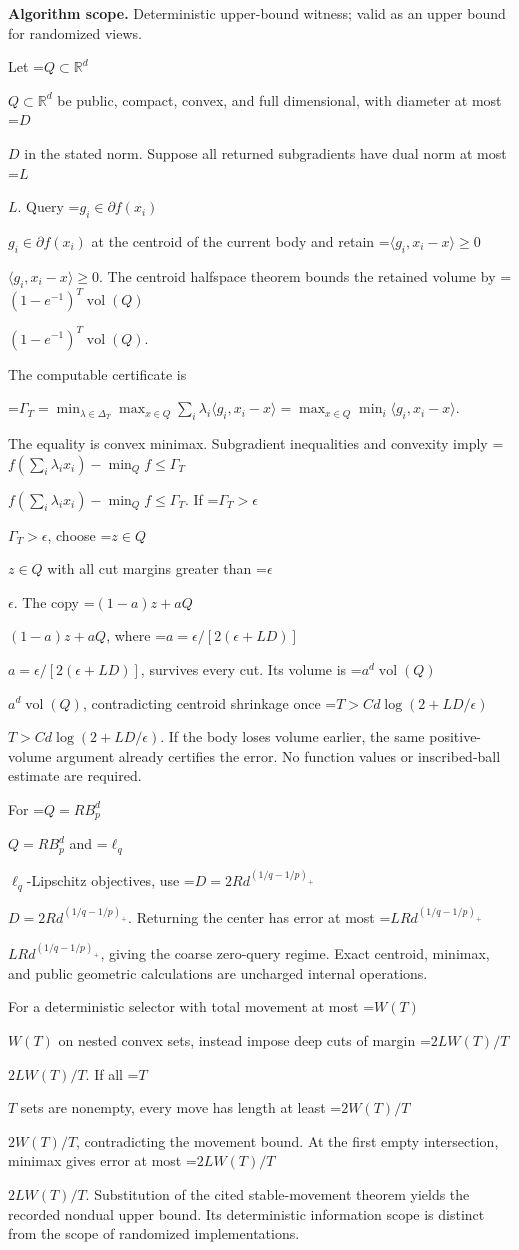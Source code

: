 \documentclass[10pt,a4paper]{article}
\newcommand{\AtlasMath}[1]{\par\begingroup\centering\setbox0=\hbox{$\displaystyle #1$}\ifdim\wd0>1.4\linewidth\typeout{ATLAS WIDE FORMULA: \the\wd0}\fi\ifdim\wd0>\linewidth\resizebox{\linewidth}{!}{\box0}\else\box0\fi\par\endgroup}
\newcommand{\AtlasInlineMath}[1]{\begingroup\setbox0=\hbox{$#1$}\ifdim\wd0>.4\linewidth\endgroup\AtlasMath{#1}\else\endgroup$#1$\fi}
\begin{document}
\textbf{Algorithm scope.} Deterministic upper-bound witness; valid as an upper bound for randomized views.

Let \AtlasInlineMath{Q\subset\mathbb R^d} be public, compact, convex, and full dimensional, with diameter at most \AtlasInlineMath{D} in the stated norm. Suppose all returned subgradients have dual norm at most \AtlasInlineMath{L}. Query \AtlasInlineMath{g_i\in\partial f(x_i)} at the centroid of the current body and retain \AtlasInlineMath{\langle g_i,x_i-x\rangle\ge0}. The centroid halfspace theorem bounds the retained volume by \AtlasInlineMath{(1-e^{-1})^T\operatorname{vol}(Q)}.

The computable certificate is

\AtlasMath{\Gamma_T=\min_{\lambda\in\Delta_T}\max_{x\in Q}\sum_i\lambda_i\langle g_i,x_i-x\rangle
=\max_{x\in Q}\min_i\langle g_i,x_i-x\rangle.}

The equality is convex minimax. Subgradient inequalities and convexity imply
\AtlasInlineMath{f(\sum_i\lambda_ix_i)-\min_Qf\le\Gamma_T}.
If \AtlasInlineMath{\Gamma_T>\epsilon}, choose \AtlasInlineMath{z\in Q} with all cut margins greater than \AtlasInlineMath{\epsilon}. The copy \AtlasInlineMath{(1-a)z+aQ}, where \AtlasInlineMath{a=\epsilon/[2(\epsilon+LD)]}, survives every cut. Its volume is \AtlasInlineMath{a^d\operatorname{vol}(Q)}, contradicting centroid shrinkage once \AtlasInlineMath{T>C d\log(2+LD/\epsilon)}. If the body loses volume earlier, the same positive-volume argument already certifies the error. No function values or inscribed-ball estimate are required.

For \AtlasInlineMath{Q=RB_p^d} and \AtlasInlineMath{\ell_q}-Lipschitz objectives, use \AtlasInlineMath{D=2Rd^{(1/q-1/p)_+}}. Returning the center has error at most \AtlasInlineMath{LRd^{(1/q-1/p)_+}}, giving the coarse zero-query regime. Exact centroid, minimax, and public geometric calculations are uncharged internal operations.

For a deterministic selector with total movement at most \AtlasInlineMath{W(T)} on nested convex sets, instead impose deep cuts of margin \AtlasInlineMath{2LW(T)/T}. If all \AtlasInlineMath{T} sets are nonempty, every move has length at least \AtlasInlineMath{2W(T)/T}, contradicting the movement bound. At the first empty intersection, minimax gives error at most \AtlasInlineMath{2LW(T)/T}. Substitution of the cited stable-movement theorem yields the recorded nondual upper bound. Its deterministic information scope is distinct from the scope of randomized implementations.
\end{document}

